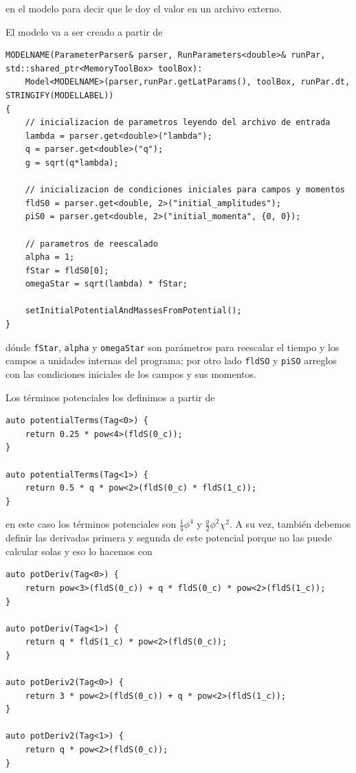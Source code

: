 \noindent
en el modelo para decir que le doy el valor en un archivo externo.

El modelo va a ser creado a partir de

\begin{lstlisting}[style = cppStyle]
MODELNAME(ParameterParser& parser, RunParameters<double>& runPar, std::shared_ptr<MemoryToolBox> toolBox):
    Model<MODELNAME>(parser,runPar.getLatParams(), toolBox, runPar.dt, STRINGIFY(MODELLABEL))
{
    // inicializacion de parametros leyendo del archivo de entrada
    lambda = parser.get<double>("lambda");
    q = parser.get<double>("q");
    g = sqrt(q*lambda);

    // inicializacion de condiciones iniciales para campos y momentos
    fldS0 = parser.get<double, 2>("initial_amplitudes");
    piS0 = parser.get<double, 2>("initial_momenta", {0, 0});

    // parametros de reescalado
    alpha = 1;
    fStar = fldS0[0];
    omegaStar = sqrt(lambda) * fStar;

    setInitialPotentialAndMassesFromPotential();
}

\end{lstlisting}

\noindent
dónde \texttt{fStar}, \texttt{alpha} y \texttt{omegaStar} son parámetros para reescalar el tiempo y los campos a unidades internas del programa; por otro lado \texttt{fldSO} y \texttt{piSO} arreglos con las condiciones iniciales de los campos y sus momentos.

Los términos potenciales los definimos a partir de

\begin{lstlisting}[style = cppStyle]
auto potentialTerms(Tag<0>) {
    return 0.25 * pow<4>(fldS(0_c));
}

auto potentialTerms(Tag<1>) {
    return 0.5 * q * pow<2>(fldS(0_c) * fldS(1_c));
}

\end{lstlisting}

\noindent
en este caso los términos potenciales son $\displaystyle \frac{1}{4} \phi^4$ y $\displaystyle \frac{g}{2} \phi^2 \chi^2$. A su vez, también debemos definir las derivadas primera y segunda de este potencial porque no las puede calcular solas y eso lo hacemos con

\begin{lstlisting}[style = cppStyle]
auto potDeriv(Tag<0>) {
    return pow<3>(fldS(0_c)) + q * fldS(0_c) * pow<2>(fldS(1_c));
}

auto potDeriv(Tag<1>) {
    return q * fldS(1_c) * pow<2>(fldS(0_c));
}

auto potDeriv2(Tag<0>) {
    return 3 * pow<2>(fldS(0_c)) + q * pow<2>(fldS(1_c));
}

auto potDeriv2(Tag<1>) {
    return q * pow<2>(fldS(0_c));
}
\end{lstlisting}

